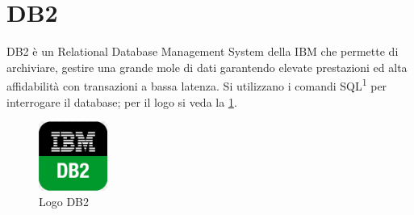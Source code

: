 \section{DB2} \label{tec:DB2}
DB2 è un Relational Database Management System della IBM che permette di archiviare, gestire una grande mole di dati garantendo elevate prestazioni ed alta affidabilità con transazioni a bassa latenza.
Si utilizzano i comandi SQL\textsuperscript{1} per interrogare il database; per il logo si veda la \figurename \space \ref*{fig:DB2}.
\begin{figure}[H]
    \centering\includegraphics[width=0.2\textwidth, height=0.2\textheight,keepaspectratio]{immagini/logo-ibm-db2.jpg}
    \caption{Logo DB2}
    \label{fig:DB2}
\end{figure}

